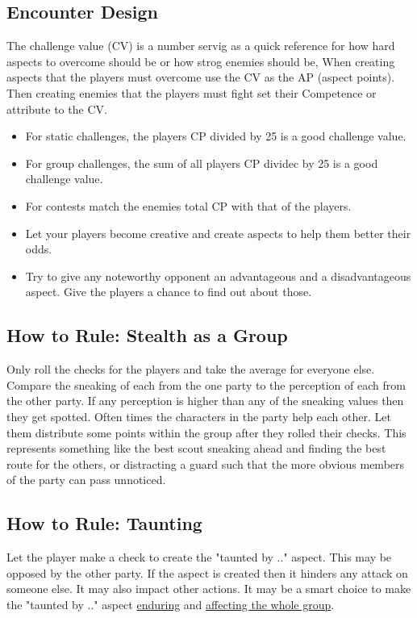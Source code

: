 \documentclass[11pt]{article}
\begin{document}
{\subsection{Encounter Design}
\label{sec:orgf8e8bd6}

The challenge value (CV) is a number servig as a quick reference for how hard aspects to overcome should be or how strog enemies should be, When creating aspects that the players must overcome use the CV as the AP (aspect points). Then creating enemies that the players must fight set their Competence or attribute to the CV.
\begin{itemize}
\item For static challenges, the players CP divided by 25 is a good challenge value.
\item For group challenges, the sum of all players CP dividec by 25 is a good challenge value.
\item For contests match the enemies total CP with that of the players.
\item Let your players become creative and create aspects to help them better their odds.
\item Try to give any noteworthy opponent an advantageous and a disadvantageous aspect. Give the players a chance to find out about those.
\end{itemize}

\subsection{How to Rule: Stealth as a Group}
\label{sec:org5428c6d}

Only roll the checks for the players and take the average for everyone else. Compare the sneaking of each from the one party to the perception of each from the other party. If any perception is higher than any of the sneaking values then they get spotted.
Often times the characters in the party help each other. Let them distribute some points within the group after they rolled their checks. This represents something like the best scout sneaking ahead and finding the best route for the others, or distracting a guard such that the more obvious members of the party can pass unnoticed.

\subsection{How to Rule: Taunting}
\label{sec:org4d9f065}
Let the player make a check to create the "taunted by .." aspect. This may be opposed by the other party. If the aspect is created then it hinders any attack on someone else. It may also impact other actions. It may be a smart choice to make the "taunted by .." aspect \hyperref[sec:orgbfa3fe3]{enduring} and \hyperref[sec:orgbc8c7a2]{affecting the whole group}. 

}
\end{document}
